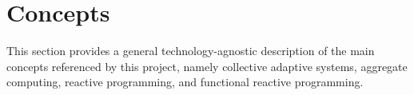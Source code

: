 
\section{Concepts}
\label{section:background:concepts}

This section provides a general technology-agnostic description of the main
concepts referenced by this project, namely collective adaptive systems,
aggregate computing, reactive programming, and functional reactive programming.





